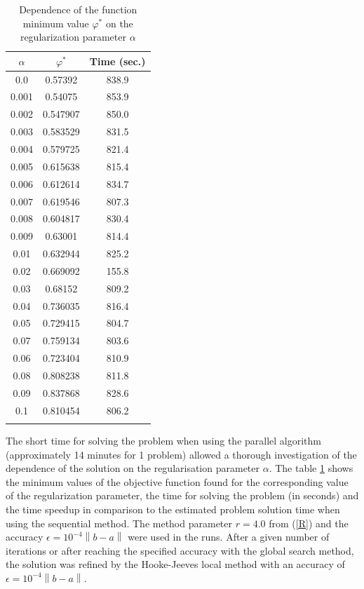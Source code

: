 \documentclass{svproc}
\begin{document}
\begin{table}
\caption{Dependence of the function minimum value $\varphi^*$ on the regularization parameter $\alpha$}
\label{table_1}
\begin{center}
\begin{tabular}{ccc}
\hline\noalign{\smallskip}
 $\alpha$      & $\varphi^*$  & Time (sec.) \\
\hline\noalign{\smallskip}
0.0	    &	0.57392		&	838.9	\\
0.001	&	0.54075		&	853.9	\\
0.002	&	0.547907	&	850.0	\\
0.003	&	0.583529	&	831.5	\\
0.004	&	0.579725	&	821.4	\\
0.005	&	0.615638	&	815.4	\\
0.006	&	0.612614	&	834.7	\\
0.007	&	0.619546	&	807.3	\\
0.008	&	0.604817	&	830.4	\\
0.009	&	0.63001		&	814.4	\\
0.01	&	0.632944	&	825.2	\\
0.02	&	0.669092	&	155.8	\\
0.03	&	0.68152		&	809.2	\\
0.04	&	0.736035	&	816.4	\\
0.05	&	0.729415	&	804.7	\\
0.07	&	0.759134	&	803.6 \\
0.06	&	0.723404	&	810.9	\\
0.08	&	0.808238	&	811.8	\\
0.09	&	0.837868	&	828.6 \\
0.1		&	0.810454	&	806.2	\\
\noalign{\smallskip}\hline
\end{tabular}\end{center}\end{table}

The short time for solving the problem when using the parallel algorithm (approximately 14 minutes for 1 problem) allowed a thorough investigation of the dependence of the solution on the regularisation parameter $\alpha$. The table \ref{table_1} shows the minimum values of the objective function found for the corresponding value of the regularization parameter, the time for solving the problem (in seconds) and the time speedup in comparison to the estimated problem solution time when using the sequential method. The method parameter $r=4.0$ from (\ref{R}) and the accuracy $\epsilon = 10^{-4}\left\|b-a\right\|$ were used in the runs. After a given number of iterations or after reaching the specified accuracy with the global search method, the solution was refined by the Hooke-Jeeves local method \cite{HookJeeves} with an accuracy of $\epsilon = 10^{-4}\left\|b-a\right\|$.
\end{document}
